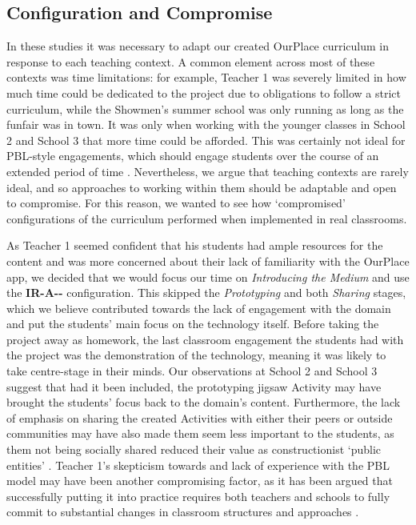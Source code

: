 \documentclass[,hyphens]{sigchi}
\begin{document}
\subsection{Configuration and Compromise}
In these studies it was necessary to adapt our created OurPlace curriculum in response to each teaching context. A common element across most of these contexts was time limitations: for example, Teacher 1 was severely limited in how much time could be dedicated to the project due to obligations to follow a strict curriculum, while the Showmen's summer school was only running as long as the funfair was in town. It was only when working with the younger classes in School 2 and School 3 that more time could be afforded. This was certainly not ideal for PBL-style engagements, which should engage students over the course of an extended period of time \cite{Blumenfeld1991}. Nevertheless, we argue that teaching contexts are rarely ideal, and so approaches to working within them should be adaptable and open to compromise. For this reason, we wanted to see how `compromised' configurations of the curriculum performed when implemented in real classrooms. 

As Teacher 1 seemed confident that his students had ample resources for the content and was more concerned about their lack of familiarity with the OurPlace app, we decided that we would focus our time on \textit{Introducing the Medium} and use the \textbf{IR-A-\--} configuration. This skipped the \textit{Prototyping} and both \textit{Sharing} stages, which we believe contributed towards the lack of engagement with the domain and put the students' main focus on the technology itself. Before taking the project away as homework, the last classroom engagement the students had with the project was the demonstration of the technology, meaning it was likely to take centre-stage in their minds. Our observations at School 2 and School 3 suggest that had it been included, the prototyping jigsaw Activity may have brought the students' focus back to the domain's content. Furthermore, the lack of emphasis on sharing the created Activities with either their peers or outside communities may have also made them seem less important to the students, as them not being socially shared reduced their value as constructionist `public entities' \cite{PapertSeymourandHarel1991a}. Teacher 1's skepticism towards and lack of experience with the PBL model may have been another compromising factor, as it has been argued that successfully putting it into practice requires both teachers and schools to fully commit to substantial changes in classroom structures and approaches \cite{InnovationUnit2016}.
\end{document}
